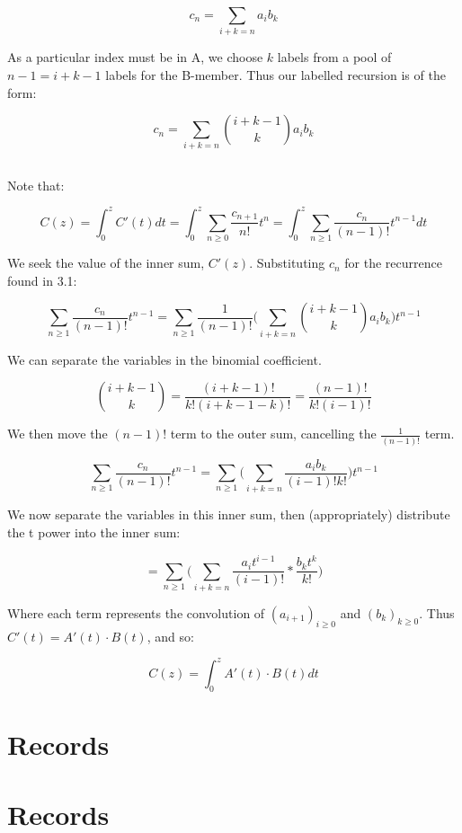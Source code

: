 \documentclass{article}
\begin{document}
$$c_n = \sum_{i + k = n} a_ib_k$$

As a particular index must be in A, we choose $k$ labels from a pool of $n-1 = i + k - 1$ labels for the B-member. Thus our labelled recursion is of the form:

$$c_n = \sum_{i + k = n} \binom{i + k - 1}{k}a_ib_k$$

\subsection{}

Note that:

$$C(z) =  \int_{0}^{z} C'(t) dt = \int_{0}^{z} \sum_{n \ge 0} \frac{c_{n+1}}{n!}t^{n}  = \int_{0}^{z} \sum_{n \ge 1} \frac{c_n}{(n-1)!}t^{n-1}  dt$$ 

We seek the value of the inner sum, $C'(z)$. Substituting $c_n$ for the recurrence found in 3.1:

$$\sum_{n \ge 1}\frac{c_n}{(n-1)!}t^{n-1}  = \sum_{n \ge 1}\frac{1}{(n-1)!} \bigg( \sum_{i + k = n} \binom{i + k - 1}{k}a_ib_k\bigg)t^{n-1}$$

We can separate the variables in the binomial coefficient.

$$\binom{i + k - 1}{k} = \frac{(i+k-1)!}{k!(i + k - 1 - k)!} = \frac{(n-1)!}{k!(i-1)!} $$

We then move the $(n-1)!$ term to the outer sum, cancelling the $\frac{1}{(n-1)!}$ term.

$$\sum_{n \ge 1}\frac{c_n}{(n-1)!}t^{n-1}  = \sum_{n \ge 1} \bigg( \sum_{i + k = n} \frac{a_ib_k}{(i-1)!k!}\bigg)t^{n-1}$$

We now separate the variables in this inner sum, then (appropriately) distribute the t power into the inner sum:

$$ = \sum_{n \ge 1} \bigg( \sum_{i + k = n} \frac{a_it^{i-1}}{(i-1)!} * \frac{b_kt^k}{k!}\bigg)$$

Where each term represents the convolution of $(a_{i+1})_{i \ge 0}$ and $(b_{k})_{k \ge 0}$. Thus $C'(t) = A'(t) \cdot B(t)$, and so:

$$C(z) = \int_{0}^{z} A'(t) \cdot B(t) dt$$

\section{Records}

\section{Records}
\end{document}
